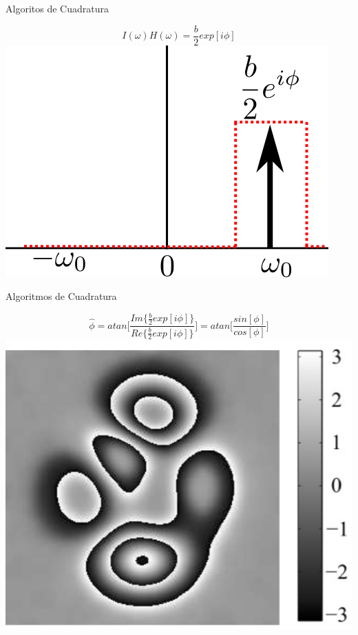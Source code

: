 \documentclass[]{beamer}
\begin{document}
\begin{frame}{Algoritos de Cuadratura}
\begin{center}

    \begin{equation}
             I(\omega) H(\omega) = \frac{b}{2}exp[i \phi]
     \end{equation}
     \pause \includegraphics[scale=0.6]{Images/FourierDomine3.png}

  \end{center}
\end{frame}
\begin{frame}{Algoritmos de Cuadratura}
\begin{center}

  \begin{equation}
    \hat \phi=atan\bigg[ \frac{ Im\{\frac{b}{2}exp[i \phi]\} }{
      Re\{\frac{b}{2}exp[i \phi]\} } \bigg] = atan\bigg[  \frac{sin[\phi]}{cos[\phi]}\bigg]
  \end{equation}
  \pause \includegraphics[scale=0.6]{Images/wPhase.png}

\end{center}
\end{frame}
\end{document}
